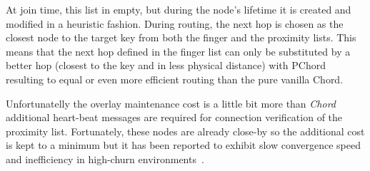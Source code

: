 At join time, this list in empty, but during the node's lifetime it is created
and modified in a heuristic fashion. During routing, the next hop is chosen
as the closest node to the target key from both the finger and the proximity
lists. This means that the next hop defined in the finger list can only be
substituted by a better hop (closest to the key and in less physical distance)
with PChord resulting to equal or even more efficient routing than the pure
vanilla Chord.

Unfortunatelly the overlay maintenance cost is a little bit more than
\emph{Chord} additional heart-beat messages are required for
connection verification of the proximity list. Fortunately, these nodes
are already close-by so the additional cost is kept to a minimum but
it has been reported to exhibit slow convergence speed 
and inefficiency in high-churn environments~\cite{DK2006}.

